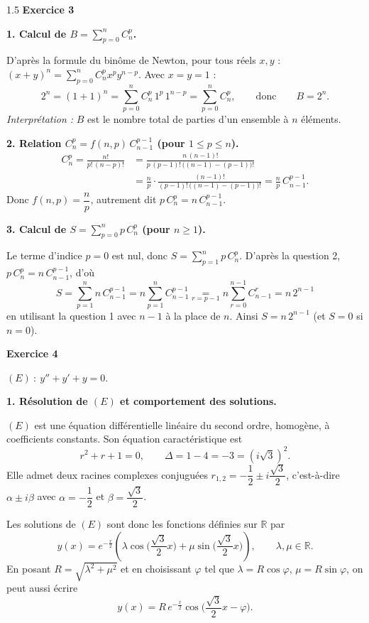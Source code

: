 \documentclass[12pt]{article}
\begin{document}
\begin{spacing}{1.5}
\medskip\textbf{Exercice 3}

\textbf{1. Calcul de $B=\displaystyle\sum_{p=0}^{n}C_n^p$.}

D'après la formule du binôme de Newton, pour tous réels $x,y$ : $(x+y)^n=\displaystyle\sum_{p=0}^{n}C_n^p x^{p}y^{n-p}$. Avec $x=y=1$ :
\[
2^n=(1+1)^n=\sum_{p=0}^{n}C_n^p\,1^{p}\,1^{n-p}=\sum_{p=0}^{n}C_n^p,\qquad\text{donc}\qquad \boxed{B=2^n}.
\]
\emph{Interprétation :} $B$ est le nombre total de parties d'un ensemble à $n$ éléments.

\textbf{2. Relation $C_n^p=f(n,p)\,C_{n-1}^{p-1}$ (pour $1\le p\le n$).}
\begin{align*}
C_n^p=\frac{n!}{p!\,(n-p)!}&=\frac{n\,(n-1)!}{p\,(p-1)!\,\big((n-1)-(p-1)\big)!}\\
&=\frac{n}{p}\cdot\frac{(n-1)!}{(p-1)!\,\big((n-1)-(p-1)\big)!}=\frac{n}{p}\,C_{n-1}^{p-1}.
\end{align*}
Donc $\boxed{f(n,p)=\dfrac{n}{p}}$, autrement dit $p\,C_n^p=n\,C_{n-1}^{p-1}$.

\textbf{3. Calcul de $S=\displaystyle\sum_{p=0}^{n}p\,C_n^p$ (pour $n\ge 1$).}

Le terme d'indice $p=0$ est nul, donc $S=\displaystyle\sum_{p=1}^{n}p\,C_n^p$. D'après la question 2, $p\,C_n^p=n\,C_{n-1}^{p-1}$, d'où
\[
S=\sum_{p=1}^{n}n\,C_{n-1}^{p-1}=n\sum_{p=1}^{n}C_{n-1}^{p-1}\underset{r=p-1}{=}n\sum_{r=0}^{n-1}C_{n-1}^{r}=n\,2^{n-1}
\]
en utilisant la question 1 avec $n-1$ à la place de $n$. Ainsi $\boxed{S=n\,2^{n-1}}$ (et $S=0$ si $n=0$).


\medskip\textbf{Exercice 4}

$(E)\ :\ y''+y'+y=0$.

\textbf{1. Résolution de $(E)$ et comportement des solutions.}

$(E)$ est une équation différentielle linéaire du second ordre, homogène, à coefficients constants. Son équation caractéristique est
\[
r^2+r+1=0,\qquad \Delta=1-4=-3=(i\sqrt3)^2 .
\]
Elle admet deux racines complexes conjuguées $r_{1,2}=-\dfrac12\pm i\dfrac{\sqrt3}{2}$, c'est-à-dire $\alpha\pm i\beta$ avec $\alpha=-\dfrac12$ et $\beta=\dfrac{\sqrt3}{2}$.

Les solutions de $(E)$ sont donc les fonctions définies sur $\mathbb{R}$ par
\[
y(x)=e^{-\frac{x}{2}}\left(\lambda\cos\Big(\frac{\sqrt3}{2}x\Big)+\mu\sin\Big(\frac{\sqrt3}{2}x\Big)\right),\qquad \lambda,\mu\in\mathbb{R}.
\]
En posant $R=\sqrt{\lambda^2+\mu^2}$ et en choisissant $\varphi$ tel que $\lambda=R\cos\varphi$, $\mu=R\sin\varphi$, on peut aussi écrire
\[
y(x)=R\,e^{-\frac{x}{2}}\cos\Big(\frac{\sqrt3}{2}x-\varphi\Big).
\]


\end{spacing}
\end{document}
